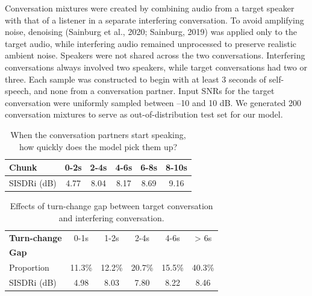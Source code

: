 {Conversation mixtures were created by combining audio from a target speaker with that of a listener in a separate interfering conversation. To avoid amplifying noise, denoising (Sainburg et al., 2020; Sainburg, 2019) was applied only to the target audio, while interfering audio remained unprocessed to preserve realistic ambient noise. Speakers were not shared across the two conversations. Interfering conversations always involved two speakers, while target conversations had two or three. Each sample was constructed to begin with at least 3 seconds of self-speech, and none from a conversation partner. Input SNRs for the target conversation  were uniformly sampled between –10 and 10 dB. We generated 200 conversation mixtures to serve as out-of-distribution test set for our model.



\begin{table}[t!]
\caption{When the conversation partners start speaking, how quickly does the model pick them up?}
\vskip -0.1in
  \setlength{\tabcolsep}{3.8pt}
\centering
{\footnotesize
\begin{tabular}{lccccc}
\toprule
\textbf{Chunk} & 0-2s & 2-4s & 4-6s  & 6-8s & 8-10s  \\
\midrule
SISDRi (dB) & 4.77 & 8.04 &  8.17 & 8.69 & 9.16 \\
\bottomrule
\end{tabular}
}
\label{tab:pickup}
\vskip -0.05in
\end{table}

\begin{table}[t!]
\caption{Effects of turn-change gap between target conversation and interfering conversation.}
\vskip -0.1in
  \setlength{\tabcolsep}{3.8pt}
\centering
{\footnotesize
\begin{tabular}{lccccc}
\toprule
\textbf{Turn-change} & 0-1s & 1-2s & 2-4s & 4-6s & > 6s  \\
\textbf{Gap} &  & & & &  \\
\midrule
Proportion & 11.3\% & 12.2\%  & 20.7\% & 15.5\%  & 40.3\% \\
SISDRi (dB) & 4.98 & 8.03  & 7.80 & 8.22  & 8.46 \\
\bottomrule
\end{tabular}
}
\label{tab:collision}
\vskip -0.15in
\end{table}


}
